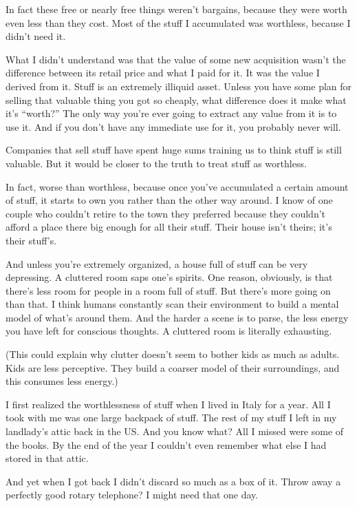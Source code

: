 \documentclass[12pt]{book}
\begin{document}
In fact these free or nearly free things weren't bargains, because they
were worth even less than they cost. Most of the stuff I accumulated was
worthless, because I didn't need it.

What I didn't understand was that the value of some new acquisition
wasn't the difference between its retail price and what I paid for it.
It was the value I derived from it. Stuff is an extremely illiquid
asset. Unless you have some plan for selling that valuable thing you got
so cheaply, what difference does it make what it's ``worth?'' The only
way you're ever going to extract any value from it is to use it. And if
you don't have any immediate use for it, you probably never will.

Companies that sell stuff have spent huge sums training us to think
stuff is still valuable. But it would be closer to the truth to treat
stuff as worthless.

In fact, worse than worthless, because once you've accumulated a certain
amount of stuff, it starts to own you rather than the other way around.
I know of one couple who couldn't retire to the town they preferred
because they couldn't afford a place there big enough for all their
stuff. Their house isn't theirs; it's their stuff's.

And unless you're extremely organized, a house full of stuff can be very
depressing. A cluttered room saps one's spirits. One reason, obviously,
is that there's less room for people in a room full of stuff. But
there's more going on than that. I think humans constantly scan their
environment to build a mental model of what's around them. And the
harder a scene is to parse, the less energy you have left for conscious
thoughts. A cluttered room is literally exhausting.

(This could explain why clutter doesn't seem to bother kids as much as
adults. Kids are less perceptive. They build a coarser model of their
surroundings, and this consumes less energy.)

I first realized the worthlessness of stuff when I lived in Italy for a
year. All I took with me was one large backpack of stuff. The rest of my
stuff I left in my landlady's attic back in the US. And you know what?
All I missed were some of the books. By the end of the year I couldn't
even remember what else I had stored in that attic.

And yet when I got back I didn't discard so much as a box of it. Throw
away a perfectly good rotary telephone? I might need that one day.
\end{document}
